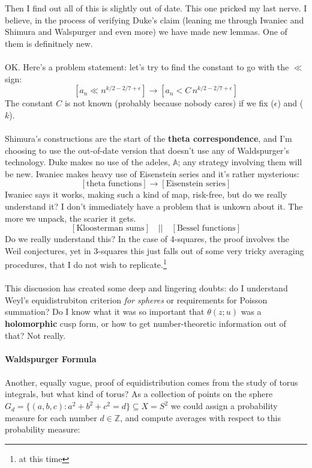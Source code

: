\documentclass[12pt]{article}
\begin{document}
\noindent Then I find out all of this is slightly out of date.  This one pricked my last nerve.  I believe, in the process of verifying Duke's claim (leaning me through Iwaniec and Shimura and Walspurger and even more) we have made new lemmas.  One of them is definitnely new.\\ \\
OK.  Here's a problem statement: let's try to find the constant to go with the $\ll$ sign:
$$  \left[ a_n  \ll n^{k/2- 2/7 + \epsilon} \right] \to \left[ a_n  <  C \, n^{k/2- 2/7 + \epsilon}\right]$$
The constant $C$ is not known (probably because nobody cares) if we fix ($\epsilon$) and  ($k$). \\ \\
Shimura's constructions are the start of the \textbf{theta correspondence}, and I'm choosing to use the out-of-date version that doesn't use any of Waldspurger's technology.  Duke makes no use of the adeles, $\mathbb{A}$; any strategy involving them will be new.  Iwaniec makes heavy use of Eisenstein series and it's rather mysterious:
$$ [\text{theta functions}] \to [\text{Eisenstein series}] $$
Iwaniec says it works, making such a kind of map, risk-free, but do we really understand it?  I don't immediately have a problem that is unkown about it.  The more we unpack, the scarier it gets.
$$ [\text{Kloosterman sums}] \quad\big|\big|\quad [\text{Bessel functions}] $$
Do we really understand this?  In the case of 4-squares, the proof involves the Weil conjectures, yet in 3-squares this just falls out of some very tricky averaging procedures, that I do not wish to replicate.\footnote{at this time} \\ \\
This discussion has created some deep and lingering doubts: do I understand Weyl's equidistrubiton criterion \textit{for spheres} or requirements for Poisson summation?  Do I know what it was so important that $\theta(z;u)$ was a \textbf{holomorphic} cusp form, or how to get number-theoretic information out of that?  Not really. \\ \\
\textbf{\color{blue!50!black!60!white} Waldspurger Formula} \\ \\
Another, equally vague, proof of equidistribution comes from the study of torus integrals, but what kind of torus?  As a collection of points on the sphere $G_d = \{ (a,b,c): a^2 + b^2 + c^2 = d\} \subseteq X = S^2 $ we could assign a probability measure for each number $d \in \mathbb{Z}$, and compute averages with respect to this probability measure:
\end{document}
